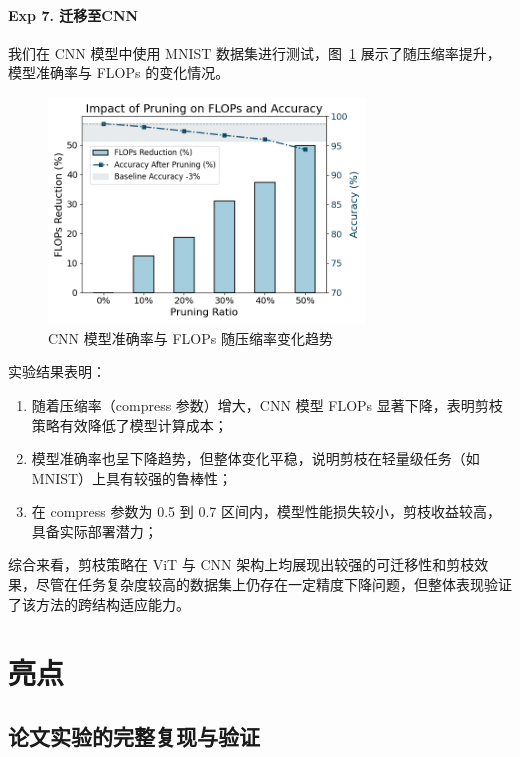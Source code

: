 \documentclass[UTF8,openany]{ctexbook}
\begin{document}
\paragraph{Exp 7. 迁移至CNN }我们在 CNN 模型中使用 MNIST 数据集进行测试，图~\ref{fig:cnn_accuracy_flops} 展示了随压缩率提升，模型准确率与 FLOPs 的变化情况。

\begin{figure}[H]
    \centering
    \includegraphics[width=0.75\textwidth]{img/extendOnCNN.png}
    \caption{CNN 模型准确率与 FLOPs 随压缩率变化趋势}
    \label{fig:cnn_accuracy_flops}
\end{figure}

实验结果表明：

\begin{enumerate}[itemsep=0pt, topsep=0pt, parsep=0pt, partopsep=0pt, label=(\arabic*)]
    \item 随着压缩率（compress 参数）增大，CNN 模型 FLOPs 显著下降，表明剪枝策略有效降低了模型计算成本；
    \item 模型准确率也呈下降趋势，但整体变化平稳，说明剪枝在轻量级任务（如 MNIST）上具有较强的鲁棒性；
    \item 在 compress 参数为 0.5 到 0.7 区间内，模型性能损失较小，剪枝收益较高，具备实际部署潜力；
\end{enumerate}

\vspace{1em}
综合来看，剪枝策略在 ViT 与 CNN 架构上均展现出较强的可迁移性和剪枝效果，尽管在任务复杂度较高的数据集上仍存在一定精度下降问题，但整体表现验证了该方法的跨结构适应能力。

\section{亮点}

\subsection{论文实验的完整复现与验证}
\end{document}
